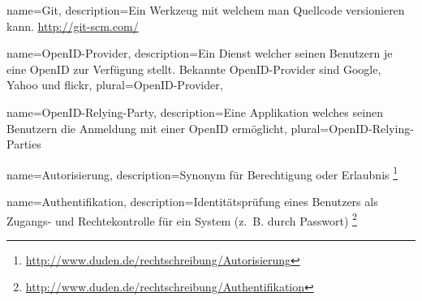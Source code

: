 {
  name=Git,
  description={Ein Werkzeug mit welchem man Quellcode versionieren kann. \url{http://git-scm.com/}}
}

{
  name=OpenID-Provider,
  description={Ein Dienst welcher seinen Benutzern je eine OpenID zur Verfügung stellt. Bekannte OpenID-Provider sind Google, Yahoo und flickr},
  plural=OpenID-Provider,
}

{
  name=OpenID-Relying-Party,
  description={Eine Applikation welches seinen Benutzern die Anmeldung mit
               einer OpenID ermöglicht},
  plural=OpenID-Relying-Parties 
}

{
  name=Autorisierung,
  description={Synonym für Berechtigung oder Erlaubnis \footnote{\url{http://www.duden.de/rechtschreibung/Autorisierung}}}
}

{
  name=Authentifikation,
  description={Identitätsprüfung eines Benutzers als Zugangs- und Rechtekontrolle für ein System (z. B. durch Passwort) \footnote{\url{http://www.duden.de/rechtschreibung/Authentifikation}}}
}

